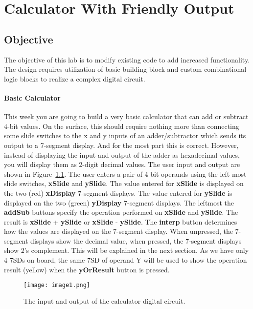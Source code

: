 \chapter{Calculator With Friendly Output}
\label{chapter:calc}
\graphicspath{ {./Lab06Calculator/Fig} }

\hypertarget{objective}{%
\section{Objective}\label{section:calcObjective}}

The objective of this lab is to modify existing code to add increased
functionality. The design requires utilization of basic building block
and custom combinational logic blocks to realize a complex digital
circuit.

\subsubsection{Basic Calculator}

This week you are going to build a very basic calculator that can add or
subtract 4-bit values. On the surface, this should require nothing more
than connecting some slide switches to the x and y inputs of an
adder/subtractor which sends its output to a 7-segment display. And for
the most part this is correct. However, instead of displaying the input
and output of the adder as hexadecimal values, you will display them as
2-digit decimal values. The user input and output are shown in Figure~\ref{fig:calcDevBoard}.
The user enters a pair of 4-bit operands using the left-most slide
switches, \textbf{xSlide} and \textbf{ySlide}. The value entered for
\textbf{xSlide} is displayed on the two (red) \textbf{xDisplay}
7-segment displays. The value entered for \textbf{ySlide} is displayed
on the two (green) \textbf{yDisplay} 7-segment displays. The leftmost
the \textbf{addSub} buttons specify the operation performed on
\textbf{xSlide} and \textbf{ySlide}. The result is \textbf{xSlide} +
\textbf{ySlide} or \textbf{xSlide} - \textbf{ySlide}. The
\textbf{interp} button determines how the values are displayed on the
7-segment display. When unpressed, the 7-segment displays show the
decimal value, when pressed, the 7-segment displays show 2's complement.
This will be explained in the next section. As we have only 4 7SDs on
board, the same 7SD of operand Y will be used to show the operation
result (yellow) when the \textbf{yOrResult} button is pressed.

\begin{figure}[ht]
\texttt{[image:  image1.png]}
\caption{The input and output of the calculator digital circuit.}
\label{fig:calcDevBoard}
\end{figure}


